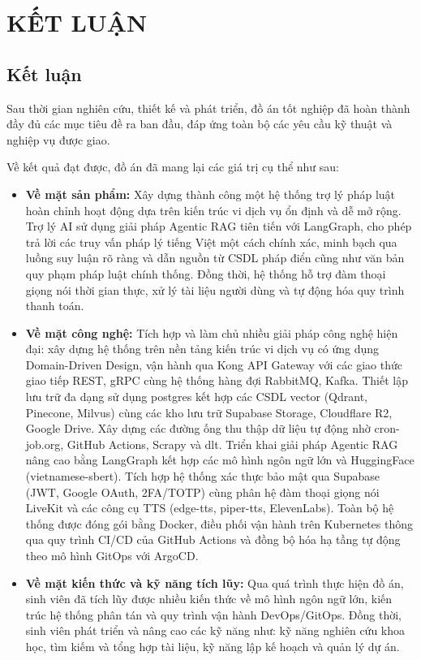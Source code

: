 \newpage
{}
{\centering \section*{KẾT LUẬN}}

\subsection*{Kết luận}

Sau thời gian nghiên cứu,
thiết kế và phát triển,
đồ án tốt nghiệp
đã hoàn thành đầy đủ các mục tiêu đề ra ban đầu,
đáp ứng toàn bộ các yêu cầu kỹ thuật
và nghiệp vụ được giao.

Về kết quả đạt được, đồ án đã mang lại các giá trị cụ thể như sau:

\begin{itemize}
\item \textbf{Về mặt sản phẩm:}
Xây dựng thành công một hệ thống trợ lý pháp luật hoàn chỉnh
hoạt động dựa trên kiến trúc vi dịch vụ
ổn định và dễ mở rộng.
Trợ lý AI sử dụng giải pháp Agentic RAG tiên tiến với LangGraph,
cho phép trả lời các truy vấn pháp lý tiếng Việt một cách chính xác,
minh bạch qua luồng suy luận rõ ràng và dẫn nguồn từ CSDL pháp điển cũng như văn bản quy phạm pháp luật chính thống.
Đồng thời, hệ thống hỗ trợ đàm thoại giọng nói thời gian thực, xử lý tài liệu người dùng và tự động hóa quy trình thanh toán.

\item \textbf{Về mặt công nghệ:}
Tích hợp và làm chủ nhiều giải pháp công nghệ hiện đại:
xây dựng hệ thống trên nền tảng kiến trúc vi dịch vụ
có ứng dụng Domain-Driven Design,
vận hành qua Kong API Gateway
với các giao thức giao tiếp REST, gRPC
cùng hệ thống hàng đợi RabbitMQ, Kafka.
Thiết lập lưu trữ đa dạng sử dụng postgres
kết hợp các CSDL vector (Qdrant, Pinecone, Milvus)
cùng các kho lưu trữ Supabase Storage, Cloudflare R2, Google Drive.
Xây dựng các đường ống thu thập dữ liệu
tự động nhờ cron-job.org, GitHub Actions, Scrapy và dlt.
Triển khai giải pháp Agentic RAG nâng cao bằng LangGraph
kết hợp các mô hình ngôn ngữ lớn
và HuggingFace (vietnamese-sbert).
Tích hợp hệ thống xác thực bảo mật qua Supabase (JWT, Google OAuth, 2FA/TOTP)
cùng phân hệ đàm thoại giọng nói LiveKit
và các công cụ TTS (edge-tts, piper-tts, ElevenLabs).
Toàn bộ hệ thống được đóng gói bằng Docker,
điều phối vận hành trên Kubernetes
thông qua quy trình CI/CD của GitHub Actions
và đồng bộ hóa hạ tầng tự động theo mô hình GitOps với ArgoCD.

\item \textbf{Về mặt kiến thức và kỹ năng tích lũy:}
Qua quá trình thực hiện đồ án,
sinh viên đã tích lũy được nhiều kiến thức
về
mô hình ngôn ngữ lớn,
kiến trúc hệ thống phân tán
và quy trình vận hành DevOps/GitOps.
Đồng thời, sinh viên phát triển
và nâng cao các kỹ năng như:
kỹ năng nghiên cứu khoa học,
tìm kiếm và tổng hợp tài liệu,
kỹ năng lập kế hoạch và quản lý dự án.

\end{itemize}

